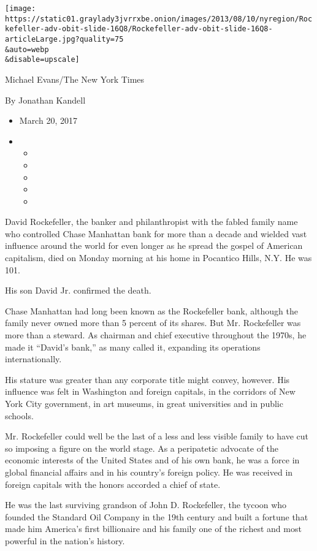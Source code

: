 \texttt{[image: https://static01.graylady3jvrrxbe.onion/images/2013/08/10/nyregion/Rockefeller-adv-obit-slide-16Q8/Rockefeller-adv-obit-slide-16Q8-articleLarge.jpg?quality=75\\\&auto=webp\\\&disable=upscale]}

Michael Evans/The New York Times

By Jonathan Kandell

\begin{itemize}
\item
  March 20, 2017
\item
  \begin{itemize}
  \item
  \item
  \item
  \item
  \item
  \end{itemize}
\end{itemize}

David Rockefeller, the banker and philanthropist with the fabled family
name who controlled Chase Manhattan bank for more than a decade and
wielded vast influence around the world for even longer as he spread the
gospel of American capitalism, died on Monday morning at his home in
Pocantico Hills, N.Y. He was 101.

His son David Jr. confirmed the death.

Chase Manhattan had long been known as the Rockefeller bank, although
the family never owned more than 5 percent of its shares. But Mr.
Rockefeller was more than a steward. As chairman and chief executive
throughout the 1970s, he made it ``David's bank,'' as many called it,
expanding its operations internationally.

His stature was greater than any corporate title might convey, however.
His influence was felt in Washington and foreign capitals, in the
corridors of New York City government, in art museums, in great
universities and in public schools.

Mr. Rockefeller could well be the last of a less and less visible family
to have cut so imposing a figure on the world stage. As a peripatetic
advocate of the economic interests of the United States and of his own
bank, he was a force in global financial affairs and in his country's
foreign policy. He was received in foreign capitals with the honors
accorded a chief of state.

He was the last surviving grandson of John D. Rockefeller, the tycoon
who founded the Standard Oil Company in the 19th century and built a
fortune that made him America's first billionaire and his family one of
the richest and most powerful in the nation's history.

